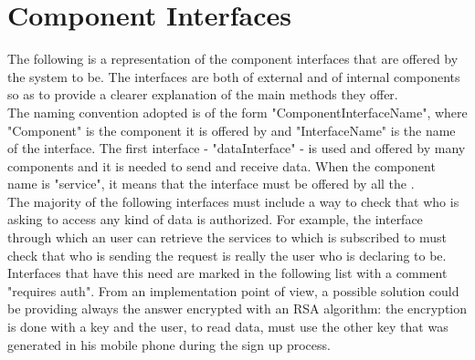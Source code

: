 \documentclass[../../DD.tex]{subfiles}
\begin{document}
\section{Component Interfaces\label{sect2.5}}

The following is a representation of the component interfaces that are offered by the system to be. The interfaces are both of external and of internal components so as to provide a clearer explanation of the main methods they offer.\\
\indent The naming convention adopted is of the form "Component\textunderscore InterfaceName", where "Component" is the component it is offered by and "InterfaceName" is the name of the interface. The first interface - "dataInterface" - is used and offered by many components and it is needed to send and receive data. When the component name is "service", it means that the interface must be offered by all the .\\
\indent The majority of the following interfaces must include a way to check that who is asking to access any kind of data is authorized. For example, the interface through which an user can retrieve the services to which is subscribed to must check that who is sending the request is really the user who is declaring to be. Interfaces that have this need are marked in the following list with a comment "requires auth". From an implementation point of view, a possible solution could be providing always the answer encrypted with an RSA algorithm: the encryption is done with a key and the user, to read data, must use the other key that was generated in his mobile phone during the sign up process.
\end{document}
